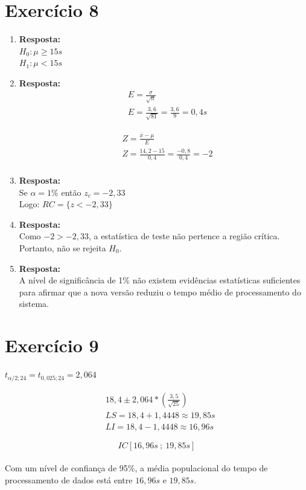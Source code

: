 \documentclass[11pt, a4paper]{article}
\begin{document}
\section{Exercício 8}
\begin{enumerate}
    \item \textbf{Resposta:}\\
    $H_0: \mu \geq 15s$\\
    $H_1: \mu < 15s$
    
    \item \textbf{Resposta:}
    \begin{align*}
        &E = \frac{\sigma}{\sqrt{n}}\\
        &E = \frac{3,6}{\sqrt{81}} = \frac{3,6}{9} = 0,4s
    \end{align*}

    \begin{align*}
        &Z = \frac{\bar{x} - \mu}{E}\\
        &Z = \frac{14,2 -  15}{0,4} = \frac{-0,8}{0,4} = -2\\[1em]
    \end{align*}
    
    \item \textbf{Resposta:}\\
    Se $\alpha = 1\%$ então $z_c = -2,33$\\
    Logo: $RC = \{z < -2,33\}$
    
    \item \textbf{Resposta:}\\
    Como $-2 > -2,33$, a estatística de teste não pertence a região crítica. Portanto, não se rejeita $H_0$.
    
    \item \textbf{Resposta:}\\
    A nível de significância de 1\% não existem evidências estatísticas suficientes para afirmar que a nova versão reduziu o tempo médio de processamento do sistema.
\end{enumerate}

\section{Exercício 9}
$t_{\alpha/2;24} = t_{0,025;24} = 2,064$

\begin{align*}
    &18,4 \pm 2,064 * (\frac{3,5}{\sqrt{25}})\\
    &LS = 18,4 + 1,4448 \approx 19,85s\\
    &LI = 18,4 - 1,4448 \approx 16,96s
\end{align*}

\[IC[16,96s\:;\:19,85s]\]\\[1em]

Com um nível de confiança de 95\%, a média populacional do tempo de processamento de dados está entre $16,96s$ e $19,85s$.
\end{document}
